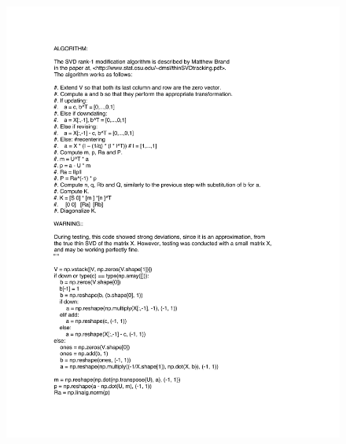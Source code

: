 \documentclass{article}
\begin{document}
\begin{figure}[ht1!]
\begin{center}
    \includegraphics[page=2, bb=0.0in 0.0in 8.5in 9in, scale=.5]{half2.pdf}
    \label{overflow}
  \end{center}
\end{figure}
\end{document}
